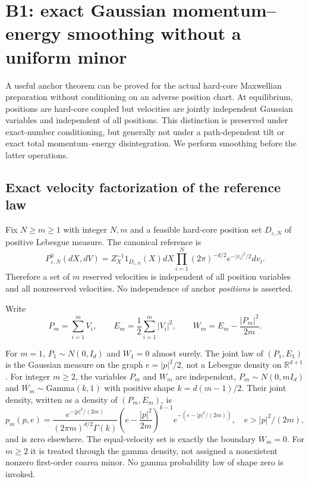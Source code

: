 \section{B1: exact Gaussian momentum--energy smoothing without a uniform minor}
\label{sec:r33-b1}

A useful anchor theorem can be proved for the actual hard-core Maxwellian preparation without conditioning on an adverse position chart. At equilibrium, positions are hard-core coupled but velocities are jointly independent Gaussian variables and independent of all positions. This distinction is preserved under exact-number conditioning, but generally not under a path-dependent tilt or exact total momentum--energy disintegration. We perform smoothing before the latter operations.

\subsection{Exact velocity factorization of the reference law}
Fix $N\ge m\ge1$ with integer $N,m$ and a feasible hard-core position set $D_{\varepsilon,N}$ of positive Lebesgue measure. The canonical reference is
\[
 P^0_{\varepsilon,N}(dX,dV)=Z_X^{-1}1_{D_{\varepsilon,N}}(X)dX
               \prod_{i=1}^N(2\pi)^{-d/2}e^{-|v_i|^2/2}dv_i.
\]
Therefore a set of $m$ reserved velocities is independent of all position variables and all nonreserved velocities. No independence of anchor \emph{positions} is asserted.

Write
\[
 P_m=\sum_{i=1}^mV_i,\qquad E_m=\frac12\sum_{i=1}^m|V_i|^2,
 \qquad W_m=E_m-\frac{|P_m|^2}{2m}.
\]

\begin{theorem}
\label{thm:r33-b1-density}
For $m=1$, $P_1\sim N(0,I_d)$ and $W_1=0$ almost surely. The joint law of $(P_1,E_1)$ is the Gaussian measure on the graph $e=|p|^2/2$, not a Lebesgue density on $\mathbb R^{d+1}$.
For integer $m\ge2$, the variables $P_m$ and $W_m$ are independent, $P_m\sim N(0,mI_d)$ and $W_m\sim\mathrm{Gamma}(k,1)$ with positive shape $k=d(m-1)/2$. Their joint density, written as a density of $(P_m,E_m)$, is
\[
 p_m(p,e)=\frac{e^{-|p|^2/(2m)}}{(2\pi m)^{d/2}\Gamma(k)}
       \left(e-\frac{|p|^2}{2m}\right)^{k-1}
       e^{-(e-|p|^2/(2m))},\quad e>|p|^2/(2m),
\]
and is zero elsewhere. The equal-velocity set is exactly the boundary $W_m=0$. For $m\ge2$ it is treated through the gamma density, not assigned a nonexistent nonzero first-order coarea minor. No gamma probability law of shape zero is invoked.
\end{theorem}

